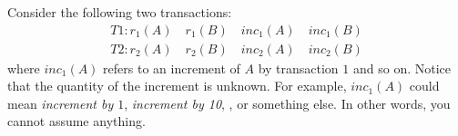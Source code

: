 

\question Consider the following two transactions:
\begin{align}
  T1: r_1(A)\quad r_1(B)\quad inc_1(A)\quad inc_1(B) \nonumber \\
  T2: r_2(A)\quad r_2(B)\quad inc_2(A)\quad inc_2(B) \nonumber 
\end{align}
where $inc_1(A)$ refers to an increment of $A$ by transaction $1$ and so on. 
Notice that the quantity of the increment is unknown. For example, $inc_1(A)$ 
could mean \textit{increment by $1$}, \textit{increment by 10}, 
, or something else. In other words, you cannot assume 
anything.

